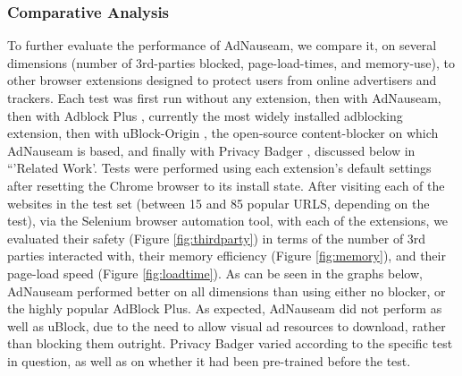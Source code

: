 \documentclass[conference]{IEEEtran}
\begin{document}
%

\subsubsection{Comparative Analysis}

To further evaluate the performance of AdNauseam, we compare it, on several dimensions (number of 3rd-parties blocked, page-load-times, and memory-use), to other browser extensions designed to protect users from online advertisers and trackers. Each test was first run without any extension, then with AdNauseam, then with Adblock Plus \cite{AdBlock}, currently the most widely installed adblocking extension, then with uBlock-Origin \cite{Gorhill}, the open-source content-blocker on which AdNauseam is based, and finally with Privacy Badger \cite{EFF}, discussed below in “'Related Work'. Tests were performed using each extension's default settings after resetting the Chrome browser to its install state. After visiting each of the websites in the test set (between 15 and 85 popular URLS, depending on the test), via the Selenium browser automation tool, with each of the extensions, we evaluated their safety (Figure \ref{fig:thirdparty}) in terms of the number of 3rd parties interacted with, their memory efficiency (Figure \ref{fig:memory}), and their page-load speed (Figure \ref{fig:loadtime}). As can be seen in the graphs below, AdNauseam performed better on all dimensions than using either no blocker, or the highly popular AdBlock Plus. As expected, AdNauseam did not perform as well as uBlock, due to the need to allow visual ad resources to download, rather than blocking them outright. Privacy Badger varied according to the specific test in question, as well as on whether it had been pre-trained before the test.
\end{document}
